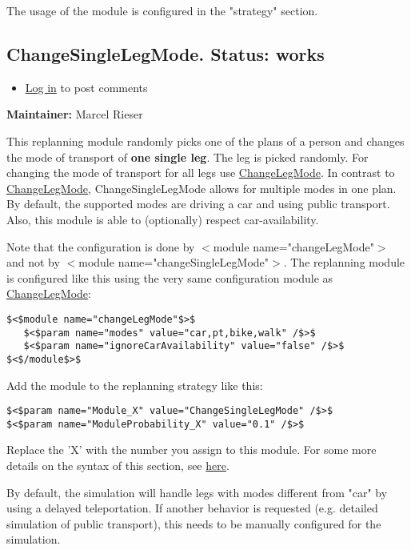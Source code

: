 \documentclass[a4paper,11pt]{report}
\begin{document}
The usage of the module is configured in the "strategy" section.

\subsection{ ChangeSingleLegMode. Status: works}
\begin{itemize}
	\item \href{http://www.matsim.org/user/login?destination=comment/reply/736%23comment-form}{Log in} to post comments
\end{itemize}

\textbf{Maintainer:} Marcel Rieser

This replanning module randomly picks one of the plans of a person and changes the mode of transport of \textbf{one single leg}. The leg is picked randomly. For changing the mode of transport for all legs use \href{http://www.matsim.org/node/387}{ChangeLegMode}. In contrast to \href{http://www.matsim.org/node/387}{ChangeLegMode},  ChangeSingleLegMode allows for multiple modes in one plan. By default,  the supported modes are driving a car and using public transport. Also,  this module is able to (optionally) respect car-availability.

Note that the configuration is done by $<$module  name="changeLegMode"$>$ and not by $<$module  name="changeSingleLegMode"$>$. The replanning module is configured like  this using the very same configuration module as \href{http://www.matsim.org/node/387}{ChangeLegMode}:
\begin{verbatim}
$<$module name="changeLegMode"$>$
   $<$param name="modes" value="car,pt,bike,walk" /$>$
   $<$param name="ignoreCarAvailability" value="false" /$>$
$<$/module$>$
\end{verbatim}

Add the module to the replanning strategy like this:
\begin{verbatim}
$<$param name="Module_X" value="ChangeSingleLegMode" /$>$
$<$param name="ModuleProbability_X" value="0.1" /$>$
\end{verbatim}

Replace the 'X' with the number you assign to this module. For some more details on the syntax of this section, see \href{http://matsim.org/node/478}{here}.


By default, the simulation will handle legs with modes different from  "car" by using a delayed teleportation. If another behavior is  requested (e.g. detailed simulation of public transport), this needs to  be manually configured for the simulation.
\end{document}
